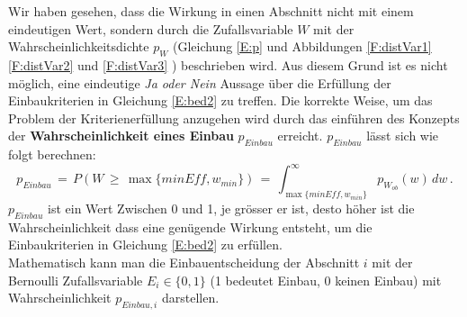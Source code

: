 Wir haben gesehen, dass die Wirkung in einen Abschnitt nicht mit einem eindeutigen Wert, sondern durch die Zufallsvariable $W$ mit der Wahrscheinlichkeitsdichte $p_W$ (Gleichung \ref{E:p}  und Abbildungen \ref{F:distVar1} \ref{F:distVar2} und \ref{F:distVar3} )  beschrieben wird. Aus diesem Grund ist es nicht möglich, eine eindeutige \textit{Ja oder Nein} Aussage über die Erfüllung der Einbaukriterien in Gleichung \ref{E:bed2} zu treffen. Die korrekte Weise, um das Problem der Kriterienerfüllung  anzugehen wird durch das einführen des Konzepts der \textbf{Wahrscheinlichkeit eines Einbau} $p_{Einbau}$ erreicht. $p_{Einbau}$ lässt sich wie folgt berechnen:
\begin{equation*}
	p_{Einbau}\,=\,P(W\,\geq \,\max\{minEff,w_{min}\})\,=\,\int_{\max\{minEff,w_{min}\}}^{\infty} p_{W_{ob}}(w)\, d w\,.
\end{equation*}
$p_{Einbau}$ ist ein Wert Zwischen 0 und 1, je grösser er ist, desto höher ist die Wahrscheinlichkeit dass eine genügende Wirkung entsteht, um die Einbaukriterien in Gleichung \ref{E:bed2} zu erfüllen.\\
Mathematisch kann man die Einbauentscheidung der Abschnitt $i$ mit der Bernoulli Zufallsvariable $E_i \in\{0,1\}$ (1 bedeutet Einbau, 0 keinen Einbau)  mit Wahrscheinlichkeit $p_{Einbau,i}$ darstellen.
